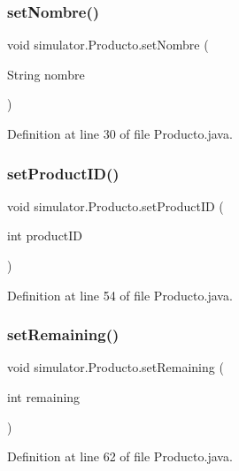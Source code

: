 \subsubsection{\texorpdfstring{set\+Nombre()}{setNombre()}}
{\footnotesize\ttfamily void simulator.\+Producto.\+set\+Nombre (\begin{DoxyParamCaption}\item[{String}]{nombre }\end{DoxyParamCaption})}



Definition at line 30 of file Producto.\+java.

\mbox{\label{classsimulator_1_1_producto_aaeb11d43521509b90df6e722e18b9382}} 
\subsubsection{\texorpdfstring{set\+Product\+I\+D()}{setProductID()}}
{\footnotesize\ttfamily void simulator.\+Producto.\+set\+Product\+ID (\begin{DoxyParamCaption}\item[{int}]{product\+ID }\end{DoxyParamCaption})}



Definition at line 54 of file Producto.\+java.

\mbox{\label{classsimulator_1_1_producto_a2df4995ec8370f2af6d72e7d9cd5aa8a}} 
\subsubsection{\texorpdfstring{set\+Remaining()}{setRemaining()}}
{\footnotesize\ttfamily void simulator.\+Producto.\+set\+Remaining (\begin{DoxyParamCaption}\item[{int}]{remaining }\end{DoxyParamCaption})}



Definition at line 62 of file Producto.\+java.

